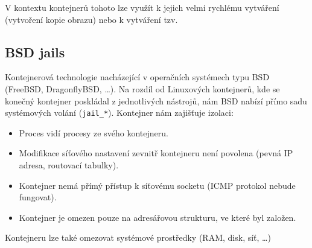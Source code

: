 V kontextu kontejnerů tohoto lze využít k jejich velmi rychlému vytváření (vytvoření kopie obrazu) nebo k vytváření tzv. 
\cite{fs_cow}

\subsection{BSD jails}

Kontejnerová technologie nacházející v operačních systémech typu BSD (FreeBSD, DragonflyBSD, \ldots).
Na rozdíl od Linuxových kontejnerů, kde se konečný kontejner poskládal z jednotlivých nástrojů, nám BSD nabízí přímo sadu systémových volání (\verb|jail_*|).
Kontejner nám zajišťuje izolaci:

\begin{itemize}
	\item Proces vidí procesy ze svého kontejneru.
	\item Modifikace síťového nastavení zevnitř kontejneru není povolena (pevná IP adresa, routovací tabulky).
	\item Kontejner nemá přímý přístup k síťovému socketu (ICMP protokol nebude fungovat).
	\item Kontejner je omezen pouze na adresářovou strukturu, ve které byl založen.
\end{itemize}

Kontejneru lze také omezovat systémové prostředky (RAM, disk, síť, \ldots)



